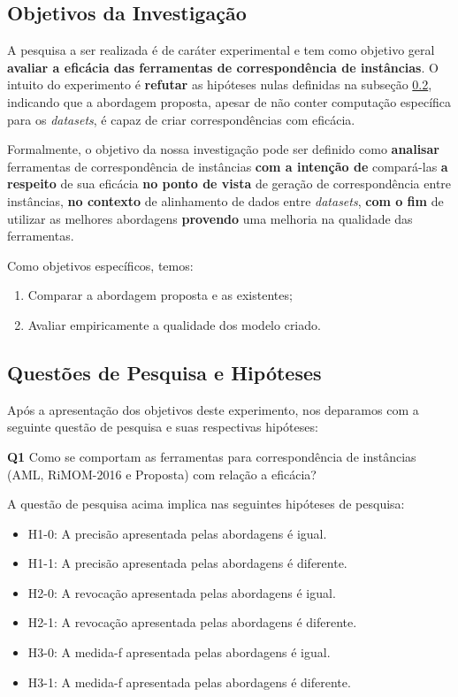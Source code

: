 \subsection{Objetivos da Investigação}
A pesquisa a ser realizada é de caráter experimental e tem como objetivo geral \textbf{avaliar a eficácia das ferramentas de correspondência de instâncias}. O intuito do experimento é \textbf{refutar} as hipóteses nulas definidas na subseção \ref{sub:hipoteses}, indicando que a abordagem proposta, apesar de não conter computação específica para os \textit{datasets}, é capaz de criar correspondências com eficácia.

Formalmente, o objetivo da nossa investigação pode ser definido como \textbf{analisar} ferramentas de correspondência de instâncias \textbf{com a intenção de} compará-las \textbf{a respeito} de sua eficácia \textbf{no ponto de vista} de geração de correspondência entre instâncias, \textbf{no contexto} de alinhamento de dados entre \textit{datasets}, \textbf{com o fim} de utilizar as melhores abordagens \textbf{provendo} uma melhoria na qualidade das ferramentas.

Como objetivos específicos, temos:
\begin{enumerate}[label=\roman*]
\item Comparar a abordagem proposta e as existentes;
\item Avaliar empiricamente a qualidade dos modelo criado.
\end{enumerate}


\subsection{Questões de Pesquisa e Hipóteses}
\label{sub:hipoteses}
Após a apresentação dos objetivos deste experimento, nos deparamos com a seguinte questão de pesquisa e suas respectivas hipóteses:

\textbf{Q1} Como se comportam as ferramentas para correspondência de instâncias (AML, RiMOM-2016 e Proposta) com relação a eficácia? 

A questão de pesquisa acima implica nas seguintes hipóteses de pesquisa:

\begin{itemize}
\item H1-0: A precisão apresentada pelas abordagens é igual.
\item H1-1: A precisão apresentada pelas abordagens é diferente.
\item H2-0: A revocação apresentada pelas abordagens é igual.
\item H2-1: A revocação apresentada pelas abordagens é diferente.
\item H3-0: A medida-f apresentada pelas abordagens é igual.
\item H3-1: A medida-f apresentada pelas abordagens é diferente.
\end{itemize}

